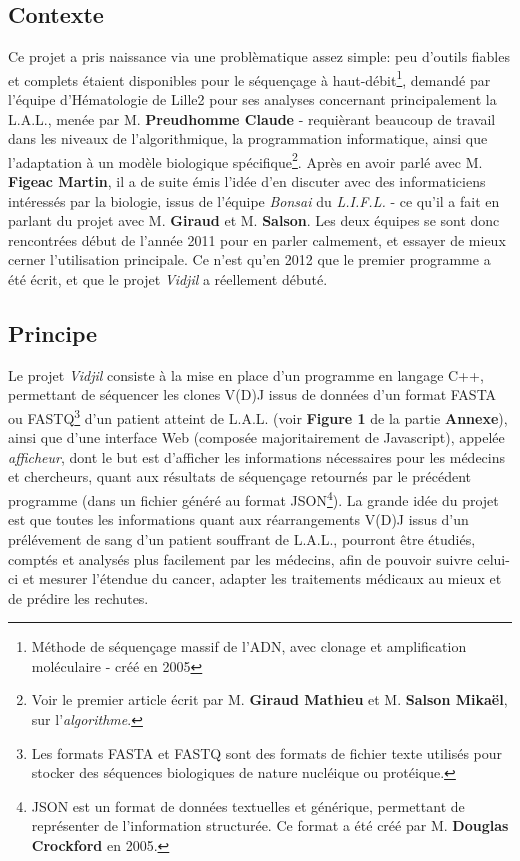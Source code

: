 \documentclass[12pt]{report}
\begin{document}
\begin{spacing}{1.2}
\subsection{Contexte}
Ce projet a pris naissance via une problèmatique assez simple: peu d'outils fiables et complets étaient disponibles pour le séquençage à haut-débit\footnote{Méthode de séquençage massif de l'ADN, avec clonage et amplification moléculaire - créé en 2005}, demandé par l'équipe d'Hématologie de Lille2 pour ses analyses concernant principalement la L.A.L., menée par M. \textbf{Preudhomme Claude} - requièrant beaucoup de travail dans les niveaux de l'algorithmique, la programmation informatique, ainsi que l'adaptation à un modèle biologique spécifique\footnote{Voir le premier article écrit par M. \textbf{Giraud Mathieu} et M. \textbf{Salson Mikaël}, sur l'\textit{algorithme}.}.
\newline
Après en avoir parlé avec M. \textbf{Figeac Martin}, il a de suite émis l'idée d'en discuter avec des informaticiens intéressés par la biologie, issus de l'équipe \textit{Bonsai} du \textit{L.I.F.L.} - ce qu'il a fait en parlant du projet avec M. \textbf{Giraud} et M. \textbf{Salson}.
\newline
Les deux équipes se sont donc rencontrées début de l'année 2011 pour en parler calmement, et essayer de mieux cerner l'utilisation principale. Ce n'est qu'en 2012 que le premier programme a été écrit, et que le projet \textit{Vidjil} a réellement débuté.

\subsection{Principe}
Le projet \textit{Vidjil} consiste à la mise en place d'un programme en langage C++, permettant de séquencer les clones V(D)J issus de données d'un format FASTA ou FASTQ\footnote{Les formats FASTA et FASTQ sont des formats de fichier texte utilisés pour stocker des séquences biologiques de nature nucléique ou protéique.} d'un patient atteint de L.A.L. (voir \textbf{Figure 1} de la partie \textbf{Annexe}), ainsi que d'une interface Web (composée majoritairement de Javascript), appelée \textit{afficheur}, dont le but est d'afficher les informations nécessaires pour les médecins et chercheurs, quant aux résultats de séquençage retournés par le précédent programme (dans un fichier généré au format JSON\footnote{JSON est un format de données textuelles et générique, permettant de représenter de l'information structurée. Ce format a été créé par M. \textbf{Douglas Crockford} en 2005.}).
\newline
La grande idée du projet est que toutes les informations quant aux réarrangements V(D)J issus d'un prélévement de sang d'un patient souffrant de L.A.L., pourront être étudiés, comptés et analysés plus facilement par les médecins, afin de pouvoir suivre celui-ci et mesurer l'étendue du cancer, adapter les traitements médicaux au mieux et de prédire les rechutes.


\end{spacing}
\end{document}
